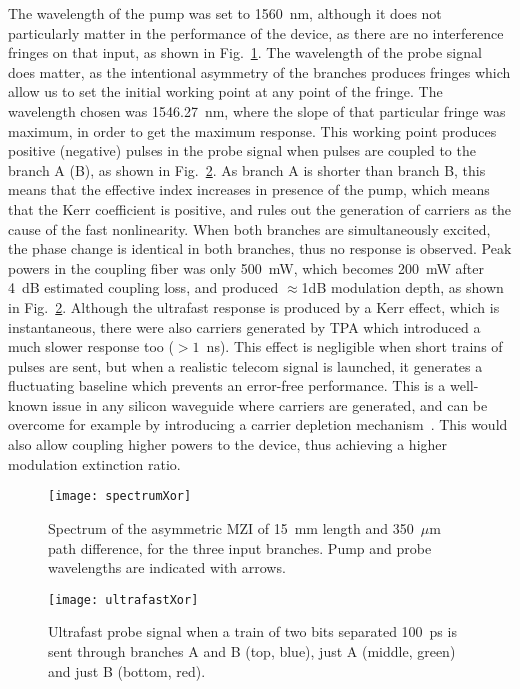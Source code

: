The wavelength of the pump was set to 1560~nm, although it does not particularly matter in the performance of the device, as there are no interference fringes on that input, as shown in Fig.~\ref{fig:spectrumXor}. The wavelength of the probe signal does matter, as the intentional asymmetry of the branches produces fringes which allow us to set the initial working point at any point of the fringe. The wavelength chosen was 1546.27~nm, where the slope of that particular fringe was maximum, in order to get the maximum response. This working point produces positive (negative) pulses in the probe signal when pulses are coupled to the branch A (B), as shown in Fig.~\ref{fig:ultrafastXor}. As branch A is shorter than branch B, this means that the effective index increases in presence of the pump, which means that the Kerr coefficient is positive, and rules out the generation of carriers as the cause of the fast nonlinearity. When both branches are simultaneously excited, the phase change is identical in both 
branches, thus no response is observed. Peak powers in the coupling fiber was only 500~mW, which becomes 200~mW after 4~dB estimated coupling loss, and produced $\approx$1dB modulation depth, as shown in Fig.~\ref{fig:ultrafastXor}.
Although the ultrafast response is produced by a Kerr effect, which is instantaneous, there were also carriers generated by TPA which introduced a much slower response too ($>1$~ns). This effect is negligible when short trains of pulses are sent, but when a realistic telecom signal is launched, it generates a fluctuating baseline which prevents an error-free performance. This is a well-known issue in any silicon waveguide where carriers are generated, and can be overcome for example by introducing a carrier depletion mechanism~\cite{Turner-Foster2010}. This would also allow coupling higher powers to the device, thus achieving a higher modulation extinction ratio.

\begin{figure}[htb]
    \centering
    \texttt{[image: spectrumXor]}
      \caption{Spectrum of the asymmetric MZI of 15~mm length and 350~$\mu$m path difference, for the three input branches. Pump and probe wavelengths are indicated with arrows.}
    \label{fig:spectrumXor}
\end{figure}


\begin{figure}[htb]
    \centering
    \texttt{[image: ultrafastXor]}
      \caption{Ultrafast probe signal when a train of two bits separated 100~ps is sent through branches A and B (top, blue), just A (middle, green) and just B (bottom, red).}
    \label{fig:ultrafastXor}
\end{figure}


